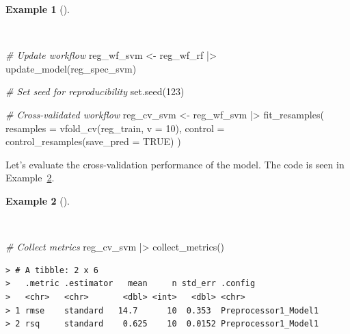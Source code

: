 \documentclass[
  letterpaper,
  DIV=11,
  numbers=noendperiod]{scrreprt}
\newenvironment{Shaded}{\begin{snugshade}}{\end{snugshade}}
\newcommand{\AttributeTok}[1]{\textcolor[rgb]{0.00,0.00,0.00}{#1}}
\newcommand{\CommentTok}[1]{\textcolor[rgb]{0.00,0.00,0.00}{\textit{#1}}}
\newcommand{\ConstantTok}[1]{\textcolor[rgb]{0.00,0.00,0.00}{#1}}
\newcommand{\DecValTok}[1]{\textcolor[rgb]{0.00,0.00,0.00}{#1}}
\newcommand{\FunctionTok}[1]{\textcolor[rgb]{0.00,0.00,0.00}{#1}}
\newcommand{\NormalTok}[1]{\textcolor[rgb]{0.00,0.00,0.00}{#1}}
\newcommand{\OtherTok}[1]{\textcolor[rgb]{0.00,0.00,0.00}{#1}}
\newcommand{\SpecialCharTok}[1]{\textcolor[rgb]{0.00,0.00,0.00}{#1}}
\theoremstyle{definition}
\newtheorem{example}{Example}[chapter]
\theoremstyle{remark}
\begin{document}
\begin{example}[]\protect\hypertarget{exm-pda-reg-model-spec-svm-workflow}{}\label{exm-pda-reg-model-spec-svm-workflow}

~

\begin{Shaded}
\begin{Highlighting}[]
\CommentTok{\# Update workflow}
\NormalTok{reg\_wf\_svm }\OtherTok{\textless{}{-}}
\NormalTok{  reg\_wf\_rf }\SpecialCharTok{|\textgreater{}}
  \FunctionTok{update\_model}\NormalTok{(reg\_spec\_svm)}

\CommentTok{\# Set seed for reproducibility}
\FunctionTok{set.seed}\NormalTok{(}\DecValTok{123}\NormalTok{)}

\CommentTok{\# Cross{-}validated workflow}
\NormalTok{reg\_cv\_svm }\OtherTok{\textless{}{-}}
\NormalTok{  reg\_wf\_svm }\SpecialCharTok{|\textgreater{}}
  \FunctionTok{fit\_resamples}\NormalTok{(}
    \AttributeTok{resamples =} \FunctionTok{vfold\_cv}\NormalTok{(reg\_train, }\AttributeTok{v =} \DecValTok{10}\NormalTok{),}
    \AttributeTok{control =} \FunctionTok{control\_resamples}\NormalTok{(}\AttributeTok{save\_pred =} \ConstantTok{TRUE}\NormalTok{)}
\NormalTok{  )}
\end{Highlighting}
\end{Shaded}

\end{example}

Let's evaluate the cross-validation performance of the model. The code
is seen in Example~\ref{exm-pda-reg-model-spec-svm-workflow-evaluate}.

\begin{example}[]\protect\hypertarget{exm-pda-reg-model-spec-svm-workflow-evaluate}{}\label{exm-pda-reg-model-spec-svm-workflow-evaluate}

~

\begin{Shaded}
\begin{Highlighting}[]
\CommentTok{\# Collect metrics}
\NormalTok{reg\_cv\_svm }\SpecialCharTok{|\textgreater{}}
  \FunctionTok{collect\_metrics}\NormalTok{()}
\end{Highlighting}
\end{Shaded}

\begin{verbatim}
> # A tibble: 2 x 6
>   .metric .estimator   mean     n std_err .config             
>   <chr>   <chr>       <dbl> <int>   <dbl> <chr>               
> 1 rmse    standard   14.7      10  0.353  Preprocessor1_Model1
> 2 rsq     standard    0.625    10  0.0152 Preprocessor1_Model1
\end{verbatim}

\end{example}
\end{document}
